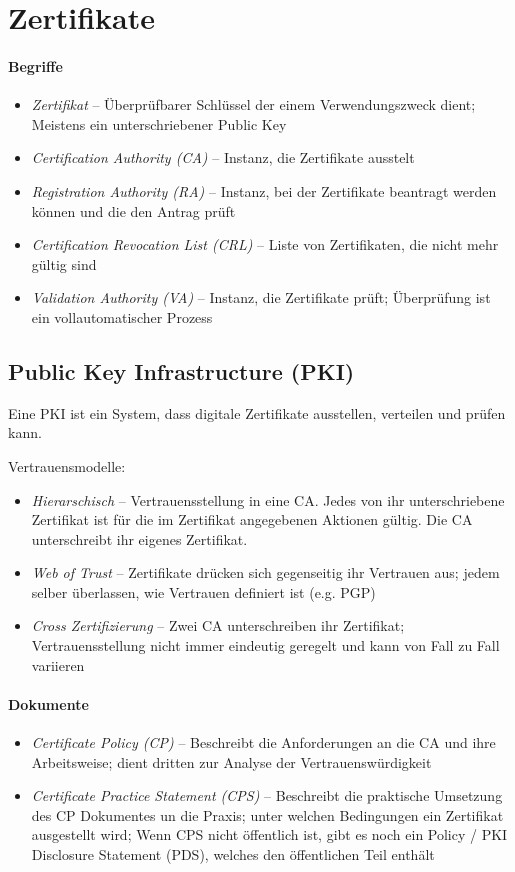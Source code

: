 \documentclass[a4paper,12pt]{article}
\begin{document}
\newpage
\section{Zertifikate}

\paragraph{Begriffe}
\begin{itemize}
\item \emph{Zertifikat} -- Überprüfbarer Schlüssel der einem Verwendungszweck dient; Meistens ein unterschriebener Public Key
\item \emph{Certification Authority (CA)} -- Instanz, die Zertifikate ausstelt
\item \emph{Registration Authority (RA)} -- Instanz, bei der Zertifikate beantragt werden können und die den Antrag prüft
\item \emph{Certification Revocation List (CRL)} -- Liste von Zertifikaten, die nicht mehr gültig sind
\item \emph{Validation Authority (VA)} -- Instanz, die Zertifikate prüft; Überprüfung ist ein vollautomatischer Prozess
\end{itemize}

\subsection{Public Key Infrastructure (PKI)}
Eine PKI ist ein System, dass digitale Zertifikate ausstellen, verteilen und prüfen kann.

Vertrauensmodelle:
\begin{itemize}
\item \emph{Hierarschisch} -- Vertrauensstellung in eine CA. Jedes von ihr unterschriebene Zertifikat ist für die im Zertifikat angegebenen Aktionen gültig. Die CA unterschreibt ihr eigenes Zertifikat.
\item \emph{Web of Trust} -- Zertifikate drücken sich gegenseitig ihr Vertrauen aus; jedem selber überlassen, wie Vertrauen definiert ist (e.g. PGP)
\item \emph{Cross Zertifizierung} -- Zwei CA unterschreiben ihr Zertifikat; Vertrauensstellung nicht immer eindeutig geregelt und kann von Fall zu Fall variieren
\end{itemize}

\paragraph{Dokumente}
\begin{itemize}
\item \emph{Certificate Policy (CP)} -- Beschreibt die Anforderungen an die CA und ihre Arbeitsweise; dient dritten zur Analyse der Vertrauenswürdigkeit
\item \emph{Certificate Practice Statement (CPS)} -- Beschreibt die praktische Umsetzung des CP Dokumentes un die Praxis; unter welchen Bedingungen ein Zertifikat ausgestellt wird; Wenn CPS nicht öffentlich ist, gibt es noch ein Policy / PKI Disclosure Statement (PDS), welches den öffentlichen Teil enthält
\end{itemize}
\end{document}
